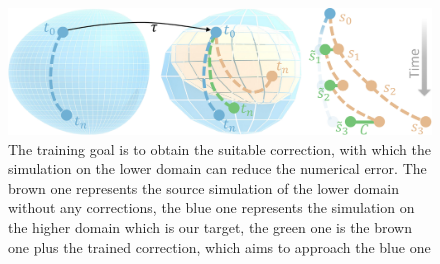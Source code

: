 \documentclass[a4paper,12pt,twoside]{report}
\begin{document}
\begin{figure}
\centering
\includegraphics[width=1.0\textwidth]{Manifolds.pdf}
\caption{The training goal is to obtain the suitable correction, with which the simulation on the lower domain can reduce the numerical error. The brown one represents the source simulation of the lower domain without any corrections, the blue one represents the simulation on the higher domain which is our target, the green one is the brown one plus the trained correction, which aims to approach the blue one\cite{um2020sol}}
\end{figure}
\end{document}
